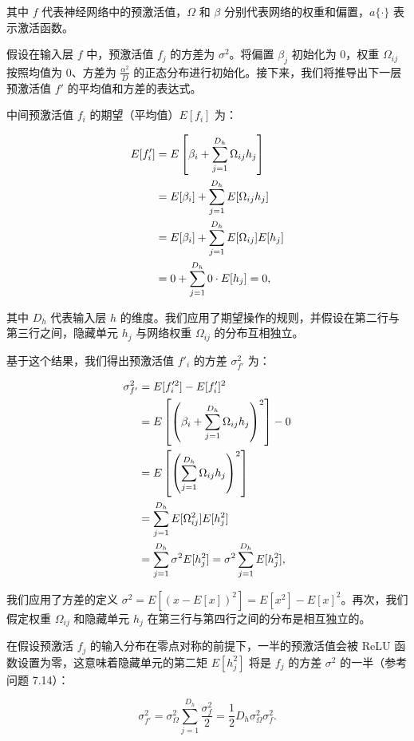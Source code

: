 其中 \(f\) 代表神经网络中的预激活值，\(\Omega\) 和 \(\beta\) 分别代表网络的权重和偏置，\(a\{\cdot\}\) 表示激活函数。

假设在输入层 \(f\) 中，预激活值 \(f_j\) 的方差为 \(\sigma^2\)。将偏置 \(\beta_j\) 初始化为 0，权重 \(\Omega_{ij}\) 按照均值为 0、方差为 \(\frac{\alpha^2}{D}\) 的正态分布进行初始化。接下来，我们将推导出下一层预激活值 \(f'\) 的平均值和方差的表达式。

中间预激活值 \(f_i\) 的期望（平均值）\(E[f_i]\) 为：



\begin{align}
E[f_i^\prime] &= E\left[\beta_i + \sum_{j=1}^{D_h} \Omega_{ij}h_j \right] \notag  \\
&= E[\beta_i] + \sum_{j=1}^{D_h} E[\Omega_{ij}h_j] \notag \\
&= E[\beta_i] + \sum_{j=1}^{D_h} E[\Omega_{ij}] E[h_j] \notag \\
&= 0 + \sum_{j=1}^{D_h} 0 \cdot E[h_j] = 0 , 
\end{align}


其中 \(D_h\) 代表输入层 \(h\) 的维度。我们应用了期望操作的规则，并假设在第二行与第三行之间，隐藏单元 \(h_j\) 与网络权重 \(\Omega_{ij}\) 的分布互相独立。

基于这个结果，我们得出预激活值 \(f'_i\) 的方差 \(\sigma_{f'}^2\) 为：



\begin{align}
\sigma_{f'}^2 &= E[f_i'^2] - E[f_i']^2 \notag \\
&= E\left[\left(\beta_i + \sum_{j=1}^{D_h} \Omega_{ij}h_j \right)^2\right] - 0 \notag \\
&= E\left[\left( \sum_{j=1}^{D_h} \Omega_{ij}h_j \right)^2\right] \notag \\
&= \sum_{j=1}^{D_h} E[\Omega_{ij}^2] E[h_j^2] \notag \\
&= \sum_{j=1}^{D_h} \sigma^2 E[h_j^2] = \sigma^2 \sum_{j=1}^{D_h} E[h_j^2], 
\end{align} 


我们应用了方差的定义 \(\sigma^2 = E[(x - E[x])^2] = E[x^2] - E[x]^2\)。再次，我们假定权重 \(\Omega_{ij}\) 和隐藏单元 \(h_j\) 在第三行与第四行之间的分布是相互独立的。

在假设预激活 \(f_j\) 的输入分布在零点对称的前提下，一半的预激活值会被 ReLU 函数设置为零，这意味着隐藏单元的第二矩 \(E[h_j^2]\) 将是 \(f_j\) 的方差 \(\sigma^2\) 的一半（参考问题 7.14）：


\begin{equation}
\sigma_{f'}^2 = \sigma_\Omega^2 \sum_{j=1}^{D_h} \frac{\sigma_f^2}{2} = \frac{1}{2} D_h\sigma_\Omega^2\sigma_f^2. 
\end{equation}

